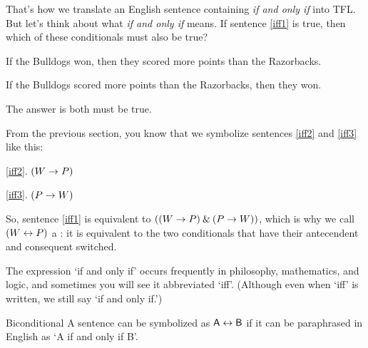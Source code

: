 That's how we translate an English sentence containing \textit{if and only if} into TFL. But let's think about what \textit{if and only if} means. If sentence \ref{iff1} is true, then which of these conditionals must also be true?
	\begin{earg}
		\item[\ex{iff2}] If the Bulldogs won, then they scored more points than the Razorbacks.
		\item[\ex{iff3}] If the Bulldogs scored more points than the Razorbacks, then they won.
	\end{earg}
The answer is both must be true.
	
From the previous section, you know that we symbolize sentences \ref{iff2} and \ref{iff3} like this:
	\begin{earg}
		\item[\ref{iff2}.] $(W \rightarrow P)$
		\item[\ref{iff3}.] $(P \rightarrow W)$ 
	\end{earg}
So, sentence \ref{iff1} is equivalent to $((W \rightarrow P) \mathbin{\&} (P \rightarrow W))$, which is why we call $(W \leftrightarrow P)$ a : it is equivalent to the two conditionals that have their antecendent and consequent switched.

The expression `if and only if' occurs frequently in philosophy, mathematics, and logic, and sometimes you will see it abbreviated `iff'. (Although even when `iff' is written, we still say `if and only if.') 

\begin{factboxy}{Biconditional}
A sentence can be symbolized as $\mathsf{A} \leftrightarrow \mathsf{B}$ if it can be paraphrased in English as `A if and only if B'.
\end{factboxy}
	

